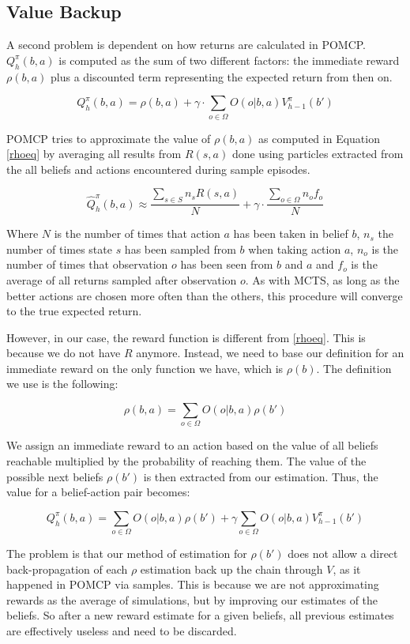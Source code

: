 \subsection{Value Backup}

A second problem is dependent on how returns are calculated in POMCP. $Q^\pi_h(b,a)$ is computed as the
sum of two different factors: the immediate reward $\rho(b,a)$ plus a discounted term representing
the expected return from then on.

\[ Q^\pi_h(b,a) = \rho(b,a) + \gamma \cdot \sum_{o\in \Omega} O(o|b,a) V^\pi_{h-1}(b') \]

POMCP tries to approximate the value of $\rho(b,a)$ as computed in Equation \ref{rhoeq} by averaging
all results from $R(s,a)$ done using particles extracted from the all beliefs and actions
encountered during sample episodes.

\[ \hat{Q}^\pi_h(b,a) \approx \frac{\sum_{s \in S} n_s R(s,a)}{N} + \gamma \cdot \frac{\sum_{o\in \Omega} n_o f_o}{N} \]

Where $N$ is the number of times that action $a$ has been taken in belief $b$, $n_s$ the number of
times state $s$ has been sampled from $b$ when taking action $a$, $n_o$ is the number of times that
observation $o$ has been seen from $b$ and $a$ and $f_o$ is the average of all returns sampled after
observation $o$. As with MCTS, as long as the better actions are chosen more often than the others,
this procedure will converge to the true expected return.

However, in our case, the reward function is different from \ref{rhoeq}. This is because we do not have $R$
anymore. Instead, we need to base our definition for an immediate reward on the only function we have,
which is $\rho(b)$. The definition we use is the following:

\[ \rho(b,a) = \sum_{o\in \Omega} O(o | b, a) \rho(b') \]

We assign an immediate reward to an action based on the value of all beliefs reachable multiplied by the
probability of reaching them. The value of the possible next beliefs $\rho(b')$ is then extracted from our estimation. Thus,
the value for a belief-action pair becomes:

\[ Q^\pi_h(b,a) = \sum_{o\in \Omega} O(o | b,a) \rho(b') + \gamma\sum_{o\in\Omega} O(o|b,a) V^\pi_{h-1}(b') \]

The problem is that our method of estimation for $\rho(b')$ does not allow a direct back-propagation
of each $\rho$ estimation back up the chain through $V$, as it happened in POMCP via samples. This
is because we are not approximating rewards as the average of simulations, but by improving our
estimates of the beliefs. So after a new reward estimate for a given beliefs, all previous estimates
are effectively useless and need to be discarded.

